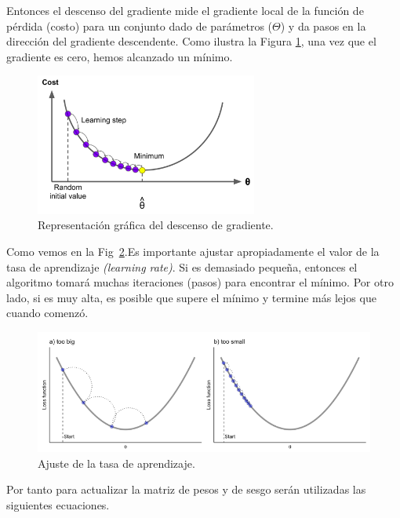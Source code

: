 \documentclass[a4paper,12pt]{article}
\begin{document}
Entonces el descenso del gradiente mide el gradiente local de la función de pérdida (costo) para un conjunto dado de parámetros ($\Theta$) y da pasos en la dirección del gradiente descendente. Como ilustra la Figura \ref{fig:gd}, una vez que el gradiente es cero, hemos alcanzado un mínimo.

\begin{figure}[H]
	\begin{center}				
	\includegraphics[width=0.65\textwidth]{023.png}
  	\caption{Representación gráfica del descenso de gradiente.}
  	\label{fig:gd}
  	\end{center}
\end{figure}

Como vemos en la Fig~\ref{fig:lr}.Es importante ajustar apropiadamente el valor de la tasa de aprendizaje \textit{(learning rate)}. Si es demasiado pequeña, entonces el algoritmo tomará muchas iteraciones (pasos) para encontrar el mínimo. Por otro lado, si es muy alta, es posible que supere el mínimo y termine más lejos que cuando comenzó.

\begin{figure}[H]
	\begin{center}				
	\includegraphics[width=1\textwidth]{tesis_37.png}
  	\caption{Ajuste de la tasa de aprendizaje.}
  	\label{fig:lr}
  	\end{center}
\end{figure}

Por tanto para actualizar la matriz de pesos y de sesgo serán utilizadas las siguientes ecuaciones.
\end{document}

